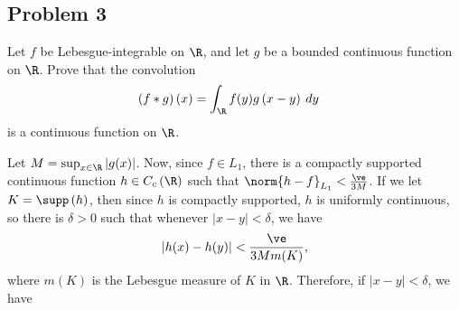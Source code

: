 \documentclass[10pt]{mypackage}
\begin{document}
\subsection{Problem 3}%
\begin{problem}
  Let $f$ be Lebesgue-integrable on $\R$, and let $g$ be a bounded continuous function on $\R$. Prove that the convolution 
  \begin{align*}
    \left( f\ast g \right)(x) &= \int_{\R}^{} f(y)g\left( x-y \right)\:dy
  \end{align*}
  is a continuous function on $\R$.
\end{problem}
Let $M = \sup_{x\in \R} \left\vert g(x) \right\vert$. Now, since $f\in L_1$, there is a compactly supported continuous function $h\in C_c\left( \R \right)$ such that $\norm{h-f}_{L_1} < \frac{\ve}{3M}$. If we let $K = \supp\left( h \right)$, then since $h$ is compactly supported, $h$ is uniformly continuous, so there is $\delta > 0$ such that whenever $\left\vert x-y \right\vert < \delta$, we have
\begin{align*}
  \left\vert h(x)-h(y) \right\vert < \frac{\ve}{3M m(K)},
\end{align*}
where $m(K)$ is the Lebesgue measure of $K$ in $\R$. Therefore, if $\left\vert x-y \right\vert < \delta$, we have
\end{document}
